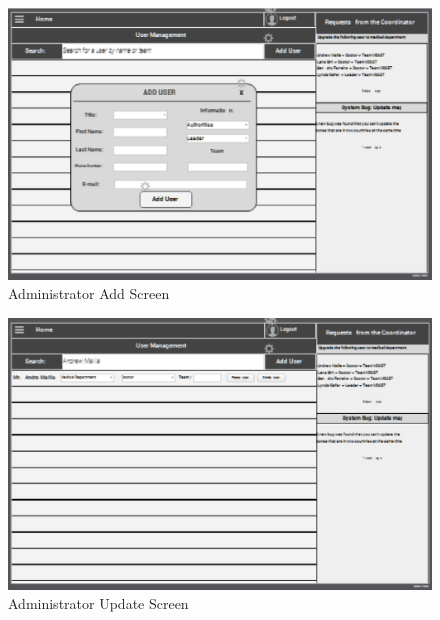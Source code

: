 \begin{figure}[htbp]
\begin{center}
 \caption{\label{fig:W21} Administrator Add Screen}
   \includegraphics[width=150mm]{./images/Web/aadminaddscreenau.eps}
\end{center}
\end{figure}
\begin{figure}[htbp]
\begin{center}
 \caption{\label{fig:W22} Administrator Update Screen}
   \includegraphics[width=150mm]{./images/Web/adminupdatescreen.eps}
\end{center}
\end{figure}
